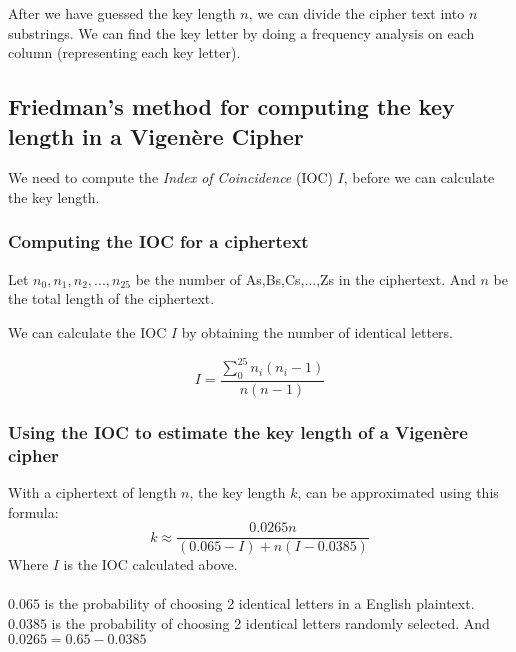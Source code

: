 \documentclass{article}
\begin{document}
	After we have guessed the key length $n$, we can divide the cipher text into $n$ substrings. We can find the key letter by doing a frequency analysis on each column (representing each key letter). 
	
	\subsection*{Friedman's method for computing the key length in a Vigenère Cipher}
	We need to compute the \textit{Index of Coincidence} (IOC) $I$, before we can calculate the key length. 
	
	\subsubsection*{Computing the IOC for a ciphertext}
	Let $n_0,n_1,n_2,...,n_25$ be the number of As,Bs,Cs,...,Zs in the ciphertext. And $n$ be the total length of the ciphertext.
		
	We can calculate the IOC $I$ by obtaining the number of identical letters.
	
	$$
	I = \frac{\sum_{0}^{25}n_i(n_i-1)}{n(n-1)}
	$$
	
	\subsubsection*{Using the IOC to estimate the key length of a Vigenère cipher}
	With a ciphertext of length $n$, the key length $k$, can be approximated using this formula:
	$$
	k \approx \frac{0.0265n}{(0.065-I) + n(I-0.0385)} 
	$$
	Where $I$ is the IOC calculated above.
	\\\\
	$0.065$ is the probability of choosing 2 identical letters in a English plaintext. $0.0385$ is the probability of choosing 2 identical letters randomly selected. And $0.0265 = 0.65 - 0.0385$
	
\end{document}
